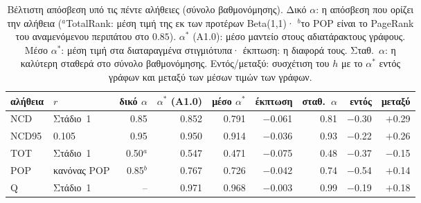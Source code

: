\begin{table}[t]
\centering
\footnotesize
\caption{Βέλτιστη απόσβεση υπό τις πέντε αλήθειες (σύνολο βαθμονόμησης). Δικό $\alpha$: η απόσβεση που ορίζει την αλήθεια ($^{a}$TotalRank: μέση τιμή της εκ των προτέρων Beta(1,1)· $^{b}$το POP είναι το PageRank του αναμενόμενου περιπάτου στο $0.85$). $\alpha^*$ (A1.0): μέσο μαντείο στους αδιατάρακτους γράφους. Μέσο $\alpha^*$: μέση τιμή στα διαταραγμένα στιγμιότυπα· έκπτωση: η διαφορά τους. Σταθ.\ $\alpha$: η καλύτερη σταθερά στο σύνολο βαθμονόμησης. Εντός/μεταξύ: συσχέτιση του $h$ με το $\alpha^*$ εντός γράφων και μεταξύ των μέσων τιμών των γράφων.}
\label{tab:anchor}
\begin{tabular}{@{}llrrrrrrr@{}}
\toprule
αλήθεια & $r$ & δικό $\alpha$ & $\alpha^*$ (A1.0) & μέσο $\alpha^*$ & έκπτωση & σταθ.\ $\alpha$ & εντός & μεταξύ \\
\midrule
NCD & Στάδιο~1 & 0.85 & 0.852 & 0.791 & $-$0.061 & 0.81 & $-$0.30 & $+$0.29 \\
NCD95 & 0.105 & 0.95 & 0.950 & 0.914 & $-$0.036 & 0.93 & $-$0.22 & $+$0.26 \\
TOT & Στάδιο~1 & 0.50$^{a}$ & 0.547 & 0.471 & $-$0.075 & 0.48 & $-$0.37 & $-$0.15 \\
POP & κανόνας POP & 0.85$^{b}$ & 0.767 & 0.726 & $-$0.042 & 0.74 & $-$0.54 & $+$0.14 \\
Q & Στάδιο~1 & -- & 0.971 & 0.968 & $-$0.003 & 0.99 & $-$0.19 & $+$0.18 \\
\bottomrule
\end{tabular}
\end{table}
